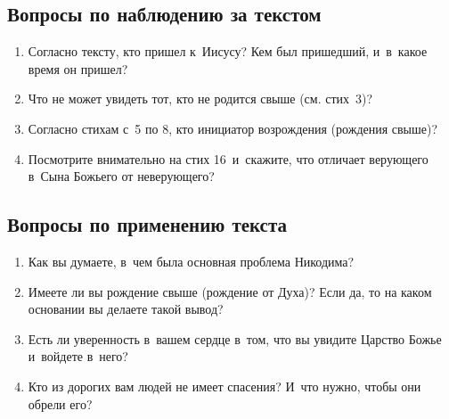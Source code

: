 \documentclass[a4paper,12pt]{article}
\begin{document}
\subsection*{Вопросы по наблюдению за текстом}
\begin{enumerate}
    \item Согласно тексту, кто пришел к~Иисусу? Кем был пришедший, и~в~какое время он пришел? 
    
    \myline
    
    \myline
    \item Что не может увидеть тот, кто не родится свыше (см. стих~3)? 
    
    \myline
    
    \myline
    \item Согласно стихам с~5 по 8, кто инициатор возрождения (рождения свыше)? 
    
    \myline
    
    \myline
    \item Посмотрите внимательно на стих 16~и~скажите, что отличает верующего в~Сына Божьего от неверующего?
    
    \myline
    
    \myline
\end{enumerate}

\subsection*{Вопросы по применению текста} 
\begin{enumerate}
    \item Как вы думаете, в~чем была основная проблема Никодима? 
    
    \myline
    
    \myline
    \item Имеете ли вы рождение свыше (рождение от Духа)? Если да, то на каком основании вы делаете такой вывод? 
    
    \myline
    
    \myline
    \item Есть ли уверенность в~вашем сердце в~том, что вы увидите Царство Божье и~войдете в~него? 
    
    \myline
    
    \myline
    \item Кто из дорогих вам людей не имеет спасения? И~что нужно, чтобы они обрели его?
    
    \myline
    
    \myline
\end{enumerate}
\end{document}
